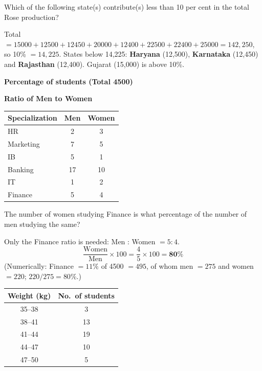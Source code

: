 Which of the following state(s) contribute(s) less than 10 per cent in the total Rose production?

Total $=15000+12500+12450+20000+12400+22500+22400+25000=142{,}250$, so 10\% $=14{,}225$.
States below 14,225: \textbf{Haryana} (12,500), \textbf{Karnataka} (12,450) and \textbf{Rajasthan} (12,400). Gujarat (15,000) is above 10\%.

\begin{minipage}{0.45\linewidth}\centering
{\scriptsize\bfseries Percentage of students (Total 4500)}\\[2pt]
\end{minipage}\hfill
\begin{minipage}{0.45\linewidth}\centering
{\scriptsize\bfseries Ratio of Men to Women}\\[2pt]\small
\begin{tabular}{lcc}\toprule Specialization & Men & Women\\\midrule
HR & 2 & 3\\ Marketing & 7 & 5\\ IB & 5 & 1\\ Banking & 17 & 10\\ IT & 1 & 2\\ Finance & 5 & 4\\\bottomrule\end{tabular}
\end{minipage}

The number of women studying Finance is what percentage of the number of men studying the same?

Only the Finance ratio is needed: Men : Women $=5:4$.
\[\frac{\text{Women}}{\text{Men}}\times100=\frac45\times100=\mathbf{80\%}\]
(Numerically: Finance $=11\%$ of 4500 $=495$, of whom men $=275$ and women $=220$; $220/275=80\%$.)

\begin{tabular}{cc}\toprule \textbf{Weight (kg)} & \textbf{No.\ of students}\\\midrule
35--38 & 3\\ 38--41 & 13\\ 41--44 & 19\\ 44--47 & 10\\ 47--50 & 5\\\bottomrule\end{tabular}

